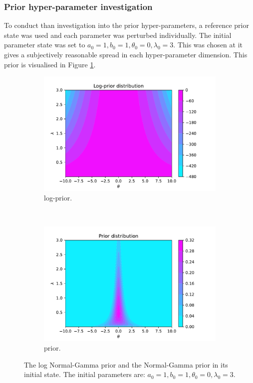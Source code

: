 \documentclass{article}
\begin{document}
\subsubsection*{Prior hyper-parameter investigation}
To conduct than investigation into the prior hyper-parameters, a reference prior state was used and each parameter was perturbed individually. The initial parameter state was set to $a_0 = 1, b_0 = 1, \theta_0 = 0, \lambda_0 = 3$. This was chosen at it gives a subjectively reasonable spread in each hyper-parameter dimension. This prior is visualised in Figure \ref{fig:Q1b_initial_prior}.
\begin{figure}[htb!]
     \centering
     \begin{subfigure}[b]{0.45\textwidth}
         \centering
         \includegraphics[width=\textwidth]{Q1b_3.pdf}
         \caption{log-prior.}
     \end{subfigure}
     ~
     \begin{subfigure}[b]{0.45\textwidth}
         \centering
         \includegraphics[width=\textwidth]{Q1b_4.pdf}
         \caption{prior.}
     \end{subfigure}
     
     \caption{The log Normal-Gamma prior and the Normal-Gamma prior in its initial state. The initial parameters are: $a_0 = 1, b_0 = 1, \theta_0 = 0, \lambda_0 = 3$.}
     \label{fig:Q1b_initial_prior}
\end{figure}
\end{document}
